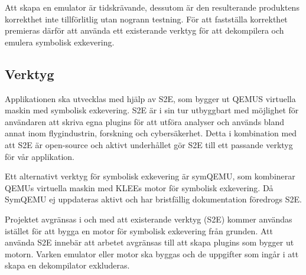 






Att skapa en emulator är tidskrävande, dessutom är den resulterande 
produktens korrekthet inte tillförlitlig utan nogrann testning. För att 
fastställa korrekthet premieras därför att använda ett existerande verktyg 
för att dekompilera och emulera symbolisk exkevering. 

\subsection{Verktyg} 

Applikationen ska utvecklas med hjälp av S2E, som bygger ut QEMUS virtuella 
maskin med symbolisk exkevering. S2E är i sin tur utbyggbart med möjlighet 
för användaren att skriva egna plugins för att utföra analyser och används 
bland annat inom flygindustrin, forskning och cybersäkerhet. Detta i 
kombination med att S2E är open-source och aktivt underhållet gör S2E till 
ett passande verktyg för vår applikation. 

Ett alternativt verktyg för symbolisk exkevering är symQEMU, som kombinerar 
QEMUs virtuella maskin med KLEEs motor för symbolisk exkevering. Då SymQEMU 
ej uppdateras aktivt och har bristfällig dokumentation föredrogs S2E. 

Projektet avgränsas i och med att existerande verktyg (S2E) kommer användas 
istället för att bygga en motor för symbolisk exkevering från grunden. 
Att använda S2E innebär att arbetet avgränsas till att skapa plugins som 
bygger ut motorn. Varken emulator eller motor ska byggas och de uppgifter 
som ingår i att skapa en dekompilator exkluderas. 

